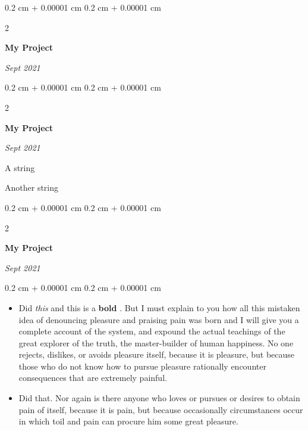 \documentclass[10pt, letterpaper]{article}
\newenvironment{summary}{
    \begin{description}[
        topsep=0.10 cm,
        parsep=0.10 cm,
        partopsep=0pt,
        itemsep=0pt,
        leftmargin=0.4 cm + 10pt
    ]
}{
    \end{description}
} %
\newenvironment{highlights}{
    \begin{itemize}[
        topsep=0.10 cm,
        parsep=0.10 cm,
        partopsep=0pt,
        itemsep=0pt,
        leftmargin=0.4 cm + 10pt
    ]
}{
    \end{itemize}
} %
\newenvironment{onecolentry}{
    \begin{adjustwidth}{
        0.2 cm + 0.00001 cm
    }{
        0.2 cm + 0.00001 cm
    }
}{
    \end{adjustwidth}
} %
\newenvironment{twocolentry}[2][]{
    \onecolentry
    \def\secondColumn{#2}
    \setcolumnwidth{\fill, 4.5 cm}
    \begin{paracol}{2}
}{
    \switchcolumn \raggedleft \secondColumn
    \end{paracol}
    \endonecolentry
} %
\let\hrefWithoutArrow\href
\renewcommand{\href}[2]{\hrefWithoutArrow{#1}{\ifthenelse{\equal{#2}{}}{ }{#2 }\raisebox{.15ex}{\footnotesize \faExternalLink*}}}
\begin{document}
        \vspace{0.2 cm}

        \begin{twocolentry}{
            
            
        \textit{Sept 2021}}
            \textbf{My Project}
        \end{twocolentry}


        \vspace{0.2 cm}

        \begin{twocolentry}{
            
            
        \textit{Sept 2021}}
            \textbf{My Project}
        \end{twocolentry}
            \begin{summary}
                \item A string
                \item Another string
            \end{summary}


        \vspace{0.2 cm}

        \begin{twocolentry}{
            
            
        \textit{Sept 2021}}
            \textbf{My Project}
        \end{twocolentry}
        \vspace{0.10 cm}
        \begin{onecolentry}
            \begin{highlights}
                \item Did \textit{this} and this is a \textbf{bold} \href{https://example.com}{link}. But I must explain to you how all this mistaken idea of denouncing pleasure and praising pain was born and I will give you a complete account of the system, and expound the actual teachings of the great explorer of the truth, the master-builder of human happiness. No one rejects, dislikes, or avoids pleasure itself, because it is pleasure, but because those who do not know how to pursue pleasure rationally encounter consequences that are extremely painful.
                \item Did that. Nor again is there anyone who loves or pursues or desires to obtain pain of itself, because it is pain, but because occasionally circumstances occur in which toil and pain can procure him some great pleasure.
            \end{highlights}
        \end{onecolentry}
\end{document}
